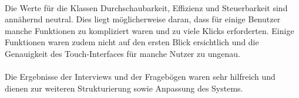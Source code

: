 \\
Die Werte für die Klassen Durchschaubarkeit, Effizienz und Steuerbarkeit sind annähernd neutral.
Dies liegt möglicherweise daran, dass für einige Benutzer manche Funktionen zu kompliziert waren und zu viele Klicks erforderten.
Einige Funktionen waren zudem nicht auf den ersten Blick ersichtlich und die Genauigkeit des Touch-Interfaces für manche Nutzer zu ungenau.
\\
\\
Die Ergebnisse der Interviews und der Fragebögen waren sehr hilfreich und dienen zur weiteren Strukturierung sowie Anpassung des Systems.





